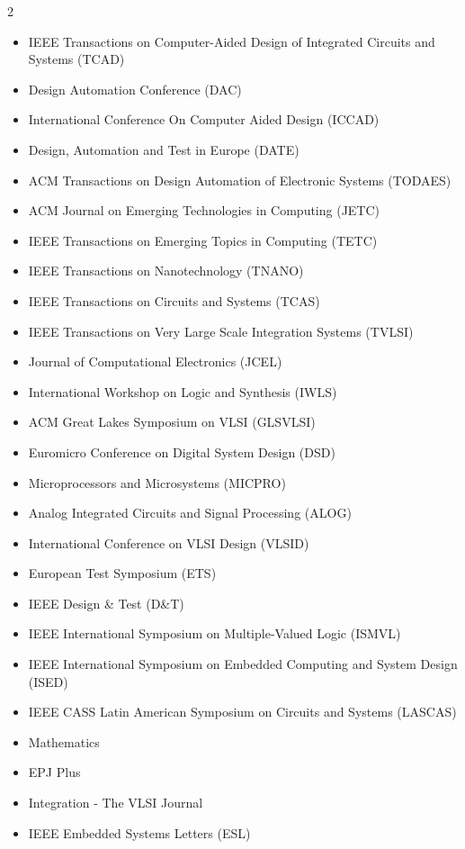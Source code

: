 \begin{cvparagraph}
\vspace{-2mm}
\begin{multicols}{2}
\begin{itemize}[leftmargin=2ex, nosep, noitemsep]
  \small
  \renewcommand{\labelitemi}{\textcolor{awesome}{\textbullet}}
  \item IEEE Transactions on Computer-Aided Design of Integrated Circuits and Systems (TCAD)
  \item Design Automation Conference (DAC)
  \item International Conference On Computer Aided Design (ICCAD)
  \item Design, Automation and Test in Europe (DATE)
  \item ACM Transactions on Design Automation of Electronic Systems (TODAES)
  \item ACM Journal on Emerging Technologies in Computing (JETC)
  \item IEEE Transactions on Emerging Topics in Computing (TETC)
  \item IEEE Transactions on Nanotechnology (TNANO)
  \item IEEE Transactions on Circuits and Systems (TCAS)
  \item IEEE Transactions on Very Large Scale Integration Systems (TVLSI)
  \item Journal of Computational Electronics (JCEL)
  \item International Workshop on Logic and Synthesis (IWLS)
  \item ACM Great Lakes Symposium on VLSI (GLSVLSI)
  \item Euromicro Conference on Digital System Design (DSD)
  \item Microprocessors and Microsystems (MICPRO)
  \item Analog Integrated Circuits and Signal Processing (ALOG)
  \item International Conference on VLSI Design (VLSID)
  \item European Test Symposium (ETS)
  \item IEEE Design \& Test (D\&T)
  \item IEEE International Symposium on Multiple-Valued Logic (ISMVL)
  \item IEEE International Symposium on Embedded Computing and System Design (ISED)
  \item IEEE CASS Latin American Symposium on Circuits and Systems (LASCAS)
  \item Mathematics
  \item EPJ Plus
  \item Integration - The VLSI Journal
  \item IEEE Embedded Systems Letters (ESL)
\end{itemize}
\end{multicols}
\end{cvparagraph}


